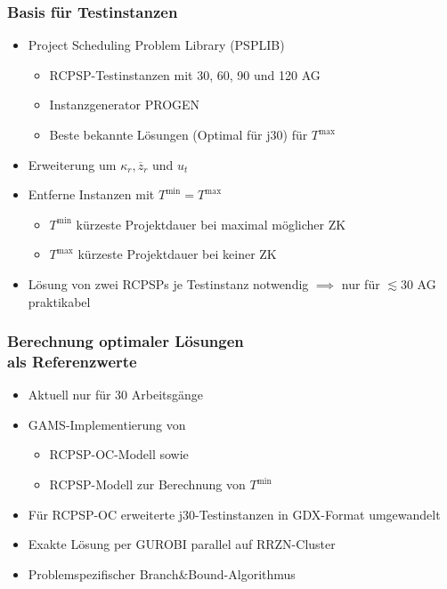 \begin{frame}[noframenumbering]
\frametitle{Basis für Testinstanzen}
\begin{itemize}
\item Project Scheduling Problem Library (PSPLIB)
	\begin{itemize}
		\item RCPSP-Testinstanzen mit 30, 60, 90 und 120 AG
		\item Instanzgenerator PROGEN
		\item Beste bekannte Lösungen (Optimal für j30) für $T^{\mbox{max}}$\\[4mm]
	\end{itemize}

\item Erweiterung um $\kappa_r, \overline{z}_r$ und $u_t$\\[4mm]

\item Entferne Instanzen mit $T^{\mbox{min}} = T^{\mbox{max}}$
	\begin{itemize}
	\item $T^{\mbox{min}}$ kürzeste Projektdauer bei maximal möglicher ZK
	\item $T^{\mbox{max}}$ kürzeste Projektdauer bei keiner ZK
	\end{itemize}
\item Lösung von zwei RCPSPs je Testinstanz notwendig $\implies$ nur für $\lesssim 30$ AG praktikabel
\end{itemize}

\end{frame}

\begin{frame}[noframenumbering]
\frametitle{Berechnung optimaler Lösungen\\als Referenzwerte}
\begin{itemize}
\item Aktuell nur für 30 Arbeitsgänge\\[4mm]
\item GAMS-Implementierung von
	\begin{itemize}
	\item RCPSP-OC-Modell sowie
	\item RCPSP-Modell zur Berechnung von $T^{\mbox{min}}$\\[4mm]
	\end{itemize}
\item Für RCPSP-OC erweiterte j30-Testinstanzen in GDX-Format umgewandelt
\item Exakte Lösung per GUROBI parallel auf RRZN-Cluster
\item Problemspezifischer Branch\&Bound-Algorithmus
\end{itemize}
\end{frame}

